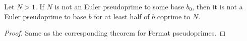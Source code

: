 \documentclass[a4paper, 10pt, twocolumn]{amsart}
\begin{document}
\begin{theorem}
 Let $N >1$. If $N$ is not an Euler pseudoprime to some base $b_0$, then it is not a Euler pseudoprime to base $b$ for at least half of $b$ coprime to $N$. 
\end{theorem}
\begin{proof}
  Same as the corresponding theorem for Fermat pseudoprimes.
\end{proof}

\end{document}
